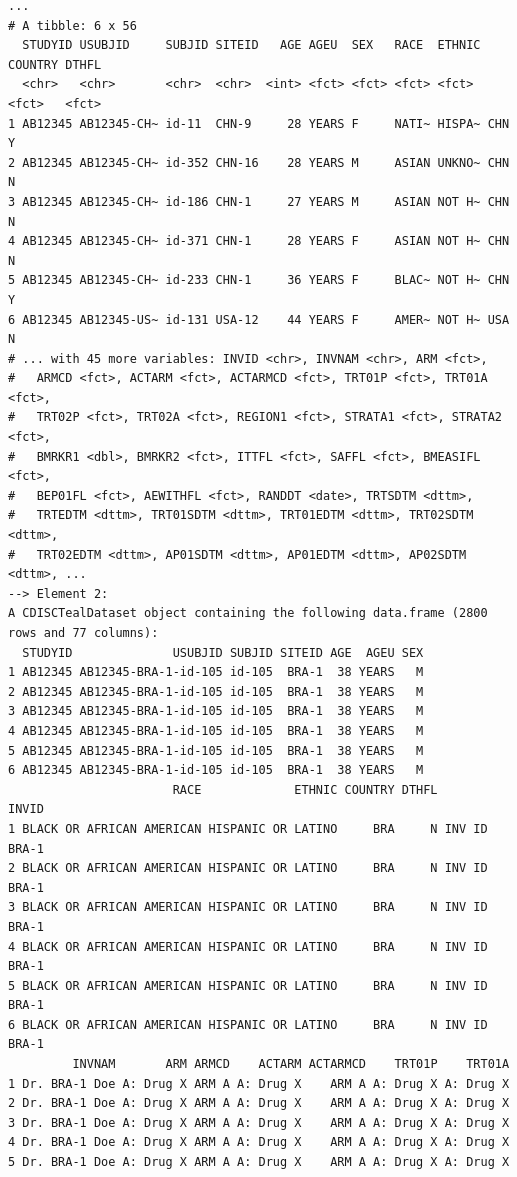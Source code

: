 \documentclass[
  letterpaper,
  DIV=11,
  numbers=noendperiod]{scrreprt}
\begin{document}
\begin{tcolorbox}[enhanced jigsaw, leftrule=.75mm, arc=.35mm, colback=white, colframe=quarto-callout-note-color-frame, opacityback=0, toprule=.15mm, bottomrule=.15mm, rightrule=.15mm, left=2mm, breakable]
\begin{minipage}[t]{\textwidth - 5.5mm}
\begin{verbatim}
...
# A tibble: 6 x 56
  STUDYID USUBJID     SUBJID SITEID   AGE AGEU  SEX   RACE  ETHNIC COUNTRY DTHFL
  <chr>   <chr>       <chr>  <chr>  <int> <fct> <fct> <fct> <fct>  <fct>   <fct>
1 AB12345 AB12345-CH~ id-11  CHN-9     28 YEARS F     NATI~ HISPA~ CHN     Y    
2 AB12345 AB12345-CH~ id-352 CHN-16    28 YEARS M     ASIAN UNKNO~ CHN     N    
3 AB12345 AB12345-CH~ id-186 CHN-1     27 YEARS M     ASIAN NOT H~ CHN     N    
4 AB12345 AB12345-CH~ id-371 CHN-1     28 YEARS F     ASIAN NOT H~ CHN     N    
5 AB12345 AB12345-CH~ id-233 CHN-1     36 YEARS F     BLAC~ NOT H~ CHN     Y    
6 AB12345 AB12345-US~ id-131 USA-12    44 YEARS F     AMER~ NOT H~ USA     N    
# ... with 45 more variables: INVID <chr>, INVNAM <chr>, ARM <fct>,
#   ARMCD <fct>, ACTARM <fct>, ACTARMCD <fct>, TRT01P <fct>, TRT01A <fct>,
#   TRT02P <fct>, TRT02A <fct>, REGION1 <fct>, STRATA1 <fct>, STRATA2 <fct>,
#   BMRKR1 <dbl>, BMRKR2 <fct>, ITTFL <fct>, SAFFL <fct>, BMEASIFL <fct>,
#   BEP01FL <fct>, AEWITHFL <fct>, RANDDT <date>, TRTSDTM <dttm>,
#   TRTEDTM <dttm>, TRT01SDTM <dttm>, TRT01EDTM <dttm>, TRT02SDTM <dttm>,
#   TRT02EDTM <dttm>, AP01SDTM <dttm>, AP01EDTM <dttm>, AP02SDTM <dttm>, ...
--> Element 2:
A CDISCTealDataset object containing the following data.frame (2800 rows and 77 columns):
  STUDYID              USUBJID SUBJID SITEID AGE  AGEU SEX
1 AB12345 AB12345-BRA-1-id-105 id-105  BRA-1  38 YEARS   M
2 AB12345 AB12345-BRA-1-id-105 id-105  BRA-1  38 YEARS   M
3 AB12345 AB12345-BRA-1-id-105 id-105  BRA-1  38 YEARS   M
4 AB12345 AB12345-BRA-1-id-105 id-105  BRA-1  38 YEARS   M
5 AB12345 AB12345-BRA-1-id-105 id-105  BRA-1  38 YEARS   M
6 AB12345 AB12345-BRA-1-id-105 id-105  BRA-1  38 YEARS   M
                       RACE             ETHNIC COUNTRY DTHFL        INVID
1 BLACK OR AFRICAN AMERICAN HISPANIC OR LATINO     BRA     N INV ID BRA-1
2 BLACK OR AFRICAN AMERICAN HISPANIC OR LATINO     BRA     N INV ID BRA-1
3 BLACK OR AFRICAN AMERICAN HISPANIC OR LATINO     BRA     N INV ID BRA-1
4 BLACK OR AFRICAN AMERICAN HISPANIC OR LATINO     BRA     N INV ID BRA-1
5 BLACK OR AFRICAN AMERICAN HISPANIC OR LATINO     BRA     N INV ID BRA-1
6 BLACK OR AFRICAN AMERICAN HISPANIC OR LATINO     BRA     N INV ID BRA-1
         INVNAM       ARM ARMCD    ACTARM ACTARMCD    TRT01P    TRT01A
1 Dr. BRA-1 Doe A: Drug X ARM A A: Drug X    ARM A A: Drug X A: Drug X
2 Dr. BRA-1 Doe A: Drug X ARM A A: Drug X    ARM A A: Drug X A: Drug X
3 Dr. BRA-1 Doe A: Drug X ARM A A: Drug X    ARM A A: Drug X A: Drug X
4 Dr. BRA-1 Doe A: Drug X ARM A A: Drug X    ARM A A: Drug X A: Drug X
5 Dr. BRA-1 Doe A: Drug X ARM A A: Drug X    ARM A A: Drug X A: Drug X

\end{verbatim}
\end{minipage}
\end{tcolorbox}
\end{document}
